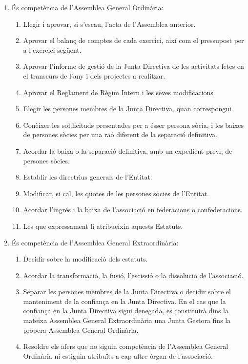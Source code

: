 \documentclass[11pt,a4paper]{article}
\newcommand{\JD}{Junta Directiva\xspace}
\newcommand{\AGO}{Assemblea General Ordinària\xspace}
\newcommand{\AGE}{Assemblea General Extraordinària\xspace}
\newcommand{\JG}{Junta Gestora\xspace}
\DeclareRobustCommand{\RRI}{Reglament de Règim Intern\xspace}
\begin{document}

\begin{enumerate}
    \item És competència de l'\AGO:
    \begin{enumerate}
        \item Llegir i aprovar, si s'escau, l'acta de l'Assemblea anterior.
        \item Aprovar el balanç de comptes de cada exercici, així com el pressupost per a l'exercici següent.
        \item Aprovar l'informe de gestió de la \JD de les activitats fetes en el transcurs de l'any i dels projectes a realitzar.
        \item Aprovar el \RRI i les seves modificacions.
        \item Elegir les persones membres de la \JD, quan correspongui.
        \item Conèixer les so\l.licituds presentades per a ésser persona sòcia, i les baixes de persones sòcies per una raó diferent de la separació definitiva.
        \item Acordar la baixa o la separació definitiva, amb un expedient previ, de persones sòcies.
        \item Establir les directrius generals de l'Entitat.
        \item Modificar, si cal, les quotes de les persones sòcies de l'Entitat.
        \item Acordar l'ingrés i la baixa de l'associació en federacions o confederacions.
        \item Les que expressament li atribueixin aquests Estatuts.
    \end{enumerate}
    \item És competència de l'\AGE:
    \begin{enumerate}
        \item Decidir sobre la modificació dels estatuts.
        \item Acordar la transformació, la fusió, l'escissió o la dissolució de l'associació.
        \item Separar les persones membres de la \JD o decidir sobre el manteniment de la confiança en la \JD. En el cas que la confiança en la \JD sigui denegada, es constituirà dins la mateixa \AGE una \JG fins la propera \AGO. \label{confianca}
        \item Resoldre els afers que no siguin competència de l'\AGO ni estiguin atribuïts a cap altre òrgan de l'associació.
    \end{enumerate}
\end{enumerate}
\end{document}

